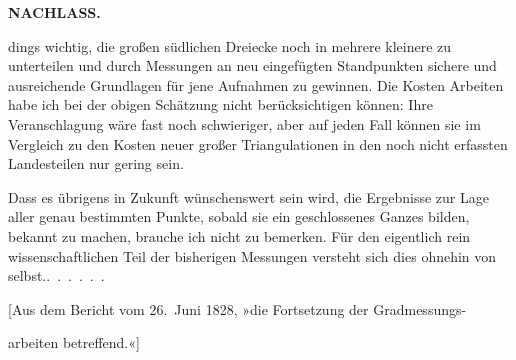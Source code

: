 \par\clearpage
\noindent{}\hfill{\small\textbf{NACHLASS.}}\hfill\null\par\medskip
\noindent dings wichtig, die großen südlichen Dreiecke noch in mehrere kleinere
zu unterteilen und durch Messungen an neu eingefügten Standpunkten sichere
und ausreichende Grundlagen für jene Aufnahmen zu gewinnen. Die Kosten 
Arbeiten habe ich bei der obigen Schätzung nicht berücksichtigen können:
Ihre Veranschlagung wäre fast noch schwieriger, aber auf jeden Fall können
sie im Vergleich zu den Kosten neuer großer Triangulationen in den noch
nicht erfassten Landesteilen nur gering sein.

Dass es übrigens in Zukunft wünschenswert sein wird, die Ergebnisse zur Lage
aller genau bestimmten Punkte, sobald sie ein geschlossenes Ganzes bilden,
 bekannt zu machen, brauche ich nicht zu bemerken.
Für den eigentlich rein wissenschaftlichen Teil der bisherigen Messungen
versteht sich dies ohnehin von selbst.\quad\mbox{.\ .\ .\ .\ .\ .}

\bigskip
\begin{center}
[Aus dem Bericht vom 26.~Juni 1828, »die Fortsetzung der Gradmessungs-\par
arbeiten betreffend.«]
\end{center}

